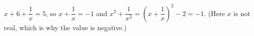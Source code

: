 $x+6+\dfrac1x=5$, so $x+\dfrac1x=-1$ and $x^2+\dfrac1{x^2}=\left(x+\dfrac1x\right)^2-2=\boxed{-1}$. (Here $x$ is not real, which is why the value is negative.)
